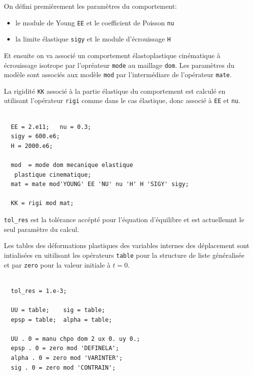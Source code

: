 \begin{castemcom}
On défini premièrement les paramètres du comportement:
\begin{itemize}

\item le module de Young  \texttt{EE} et le coefficient de Poisson \texttt{nu}

\item la limite élastique \texttt{sigy} et le module d'écrouissage \texttt{H}

\end{itemize} 
Et ensuite on va associé un comportement élastoplastique cinématique à écrouissage 
isotrope par l'opréateur \texttt{mode} au maillage \texttt{dom}. Les paramètres 
du modèle sont associés aux modèle \texttt{mod} par l'intermédiare de l'opérateur 
\texttt{mate}. 

La rigidité \texttt{KK} associé à la partie élastique du comportement 
est calculé en utilisant l'opérateur \texttt{rigi} comme dans le cas 
élastique, donc associé à \texttt{EE} et \texttt{nu}. 

\end{castemcom}
\begin{castemlines}
\begin{verbatim}

  EE = 2.e11;   nu = 0.3;
  sigy = 600.e6;
  H = 2000.e6;

  mod  = mode dom mecanique elastique 
   plastique cinematique;
  mat = mate mod'YOUNG' EE 'NU' nu 'H' H 'SIGY' sigy;

  KK = rigi mod mat;

\end{verbatim}
\end{castemlines}

\begin{castemcom}
\texttt{tol\_res} est la tolérance accépté 
pour l'équation d'équilibre et est actuellemnt 
le seul paramètre du calcul. 

Les tables des déformations plastiques des variables
internes des déplacement sont intialisées en uitilisant 
les opérateurs \texttt{table} pour la structure de 
liste généralisée et par \texttt{zero} pour la valeur 
initiale à $t = 0$.
\end{castemcom}
\begin{castemlines}
\begin{verbatim}

  tol_res = 1.e-3;

  UU = table;    sig = table; 
  epsp = table;  alpha = table;

  UU . 0 = manu chpo dom 2 ux 0. uy 0.;
  epsp . 0 = zero mod 'DEFINELA';
  alpha . 0 = zero mod 'VARINTER';
  sig . 0 = zero mod 'CONTRAIN';

\end{verbatim}
\end{castemlines}



